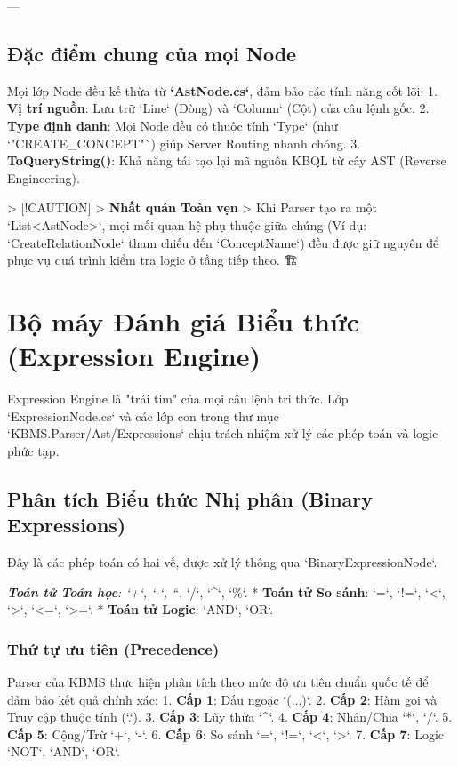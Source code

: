 ---

\subsection{Đặc điểm chung của mọi Node}
Mọi lớp Node đều kế thừa từ \textbf{`AstNode.cs`}, đảm bảo các tính năng cốt lõi:
1.  \textbf{Vị trí nguồn}: Lưu trữ `Line` (Dòng) và `Column` (Cột) của câu lệnh gốc.
2.  \textbf{Type định danh}: Mọi Node đều có thuộc tính `Type` (như `"CREATE\_CONCEPT"`) giúp Server Routing nhanh chóng.
3.  \textbf{ToQueryString()}: Khả năng tái tạo lại mã nguồn KBQL từ cây AST (Reverse Engineering).

> [!CAUTION]
> \textbf{Nhất quán Toàn vẹn}
> Khi Parser tạo ra một `List<AstNode>`, mọi mối quan hệ phụ thuộc giữa chúng (Ví dụ: `CreateRelationNode` tham chiếu đến `ConceptName`) đều được giữ nguyên để phục vụ quá trình kiểm tra logic ở tầng tiếp theo. 🏗️

\section{Bộ máy Đánh giá Biểu thức (Expression Engine)}

Expression Engine là "trái tim" của mọi câu lệnh tri thức. Lớp `ExpressionNode.cs` và các lớp con trong thư mục `KBMS.Parser/Ast/Expressions` chịu trách nhiệm xử lý các phép toán và logic phức tạp.

\subsection{Phân tích Biểu thức Nhị phân (Binary Expressions)}

Đây là các phép toán có hai vế, được xử lý thông qua `BinaryExpressionNode`.

\textit{   \textbf{Toán tử Toán học}: `+`, `-`, `}`, `/`, `^`, `\%`.
*   \textbf{Toán tử So sánh}: `=`, `!=`, `<`, `>`, `<=`, `>=`.
*   \textbf{Toán tử Logic}: `AND`, `OR`.

\subsubsection{Thứ tự ưu tiên (Precedence)}
Parser của KBMS thực hiện phân tích theo mức độ ưu tiên chuẩn quốc tế để đảm bảo kết quả chính xác:
1.  \textbf{Cấp 1}: Dấu ngoặc `(...)`.
2.  \textbf{Cấp 2}: Hàm gọi và Truy cập thuộc tính (`.`).
3.  \textbf{Cấp 3}: Lũy thừa `^`.
4.  \textbf{Cấp 4}: Nhân/Chia `*`, `/`.
5.  \textbf{Cấp 5}: Cộng/Trừ `+`, `-`.
6.  \textbf{Cấp 6}: So sánh `=`, `!=`, `<`, `>`.
7.  \textbf{Cấp 7}: Logic `NOT`, `AND`, `OR`.

